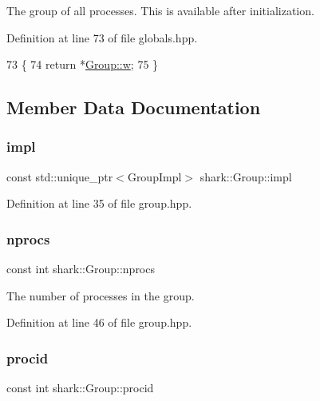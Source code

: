 The group of all processes. This is available after initialization. 

Definition at line 73 of file globals.\+hpp.


\begin{DoxyCode}
73                                 \{
74         \textcolor{keywordflow}{return} *\hyperlink{classshark_1_1_group_af542c8e71a81c12d6a73203ef9152d1f}{Group::w};
75     \}
\end{DoxyCode}


\subsection{Member Data Documentation}
\hypertarget{classshark_1_1_group_a1b1f4345bb3d08df22d32c13bd693580}{}\label{classshark_1_1_group_a1b1f4345bb3d08df22d32c13bd693580} 
\subsubsection{\texorpdfstring{impl}{impl}}
{\footnotesize\ttfamily const std\+::unique\+\_\+ptr$<$Group\+Impl$>$ shark\+::\+Group\+::impl\hspace{0.3cm}{\ttfamily [private]}}



Definition at line 35 of file group.\+hpp.

\hypertarget{classshark_1_1_group_a90e041a7fa6c40c924b17f8c2006e6b2}{}\label{classshark_1_1_group_a90e041a7fa6c40c924b17f8c2006e6b2} 
\subsubsection{\texorpdfstring{nprocs}{nprocs}}
{\footnotesize\ttfamily const int shark\+::\+Group\+::nprocs}

The number of processes in the group. 

Definition at line 46 of file group.\+hpp.

\hypertarget{classshark_1_1_group_af8c22a10243c3d05301280119b72c073}{}\label{classshark_1_1_group_af8c22a10243c3d05301280119b72c073} 
\subsubsection{\texorpdfstring{procid}{procid}}
{\footnotesize\ttfamily const int shark\+::\+Group\+::procid}

